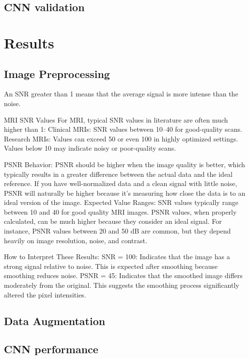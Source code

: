 %
\subsection{CNN validation}

\section{Results}

\subsection{Image Preprocessing}

An SNR greater than 1 means that the average signal is more intense than the noise.

MRI SNR Values
For MRI, typical SNR values in literature are often much higher than 1:
Clinical MRIs: SNR values between 10–40 for good-quality scans.
Research MRIs: Values can exceed 50 or even 100 in highly optimized settings.
Values below 10 may indicate noisy or poor-quality scans.

PSNR Behavior:
PSNR should be higher when the image quality is better, which typically results in a greater difference between the actual data and the ideal reference.
If you have well-normalized data and a clean signal with little noise, PSNR will naturally be higher because it’s measuring how close the data is to an ideal version of the image.
Expected Value Ranges:
SNR values typically range between 10 and 40 for good quality MRI images.
PSNR values, when properly calculated, can be much higher because they consider an ideal signal. For instance, PSNR values between 20 and 50 dB are common, but they depend heavily on image resolution, noise, and contrast.

How to Interpret These Results:
SNR = 100: Indicates that the image has a strong signal relative to noise. This is expected after smoothing because smoothing reduces noise.
PSNR = 45: Indicates that the smoothed image differs moderately from the original. This suggests the smoothing process significantly altered the pixel intensities.

\subsection{Data Augmentation}

\subsection{CNN performance}

